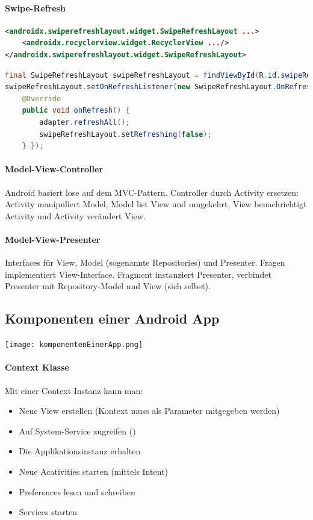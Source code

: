 \paragraph{Swipe-Refresh}
\begin{lstlisting}[language=xml]
<androidx.swiperefreshlayout.widget.SwipeRefreshLayout ...>
    <androidx.recyclerview.widget.RecyclerView .../>
</androidx.swiperefreshlayout.widget.SwipeRefreshLayout> 
\end{lstlisting}
\begin{lstlisting}[language=java]
final SwipeRefreshLayout swipeRefreshLayout = findViewById(R.id.swipeRefreshLayout);
swipeRefreshLayout.setOnRefreshListener(new SwipeRefreshLayout.OnRefreshListener() {
    @Override
    public void onRefresh() {
        adapter.refreshAll();
        swipeRefreshLayout.setRefreshing(false);
    } });
\end{lstlisting}

\paragraph{Model-View-Controller}
Android basiert lose auf dem MVC-Pattern. Controller durch Activity ersetzen: Activity manipuliert Model, Model list View und umgekehrt, View benachrichtigt Activity und Activity verändert View.

\paragraph{Model-View-Presenter}
Interfaces für View, Model (sogenannte Repositories) und Presenter. Fragen implementiert View-Interface. Fragment instanziert Presenter, verbindet Presenter mit Repository-Model und View (sich selbst).






\subsection{Komponenten einer Android App}
\texttt{[image: komponentenEinerApp.png]}
\paragraph{Context Klasse} Mit einer Context-Instanz kann man:
\begin{itemize}
\item Neue View erstellen (Kontext muss als Parameter mitgegeben werden)
\item Auf System-Service zugreifen ()
\item Die Applikationsinstanz erhalten
\item Neue Acativities starten (mittels Intent)
\item Preferences lesen und schreiben
\item Services starten
\end{itemize}
